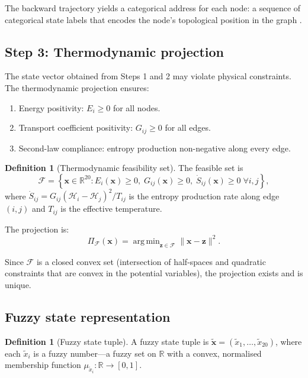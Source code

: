 \documentclass[twocolumn,10pt,a4paper]{article}
\theoremstyle{definition}
\newtheorem{definition}[theorem]{Definition}
\theoremstyle{remark}
\newcommand{\R}{\mathbb{R}}
\newcommand{\Hcal}{\mathcal{H}}
\newcommand{\Fcal}{\mathcal{F}}
\newcommand{\vect}[1]{\boldsymbol{#1}}
\newcommand{\fuzzy}[1]{\widetilde{#1}}
\DeclareMathOperator*{\argmin}{arg\,min}
\begin{document}
The backward trajectory yields a categorical address for each node: a sequence of categorical state labels that encodes the node's topological position in the graph \citep{Rabiner1989}.

\subsection{Step 3: Thermodynamic projection}

The state vector obtained from Steps 1 and 2 may violate physical constraints. The thermodynamic projection ensures:
\begin{enumerate}[label=(\alph*)]
    \item Energy positivity: $E_i \geq 0$ for all nodes.
    \item Transport coefficient positivity: $G_{ij} \geq 0$ for all edges.
    \item Second-law compliance: entropy production non-negative along every edge.
\end{enumerate}

\begin{definition}[Thermodynamic feasibility set]\label{def:feasible}
The feasible set is
\begin{equation}\label{eq:feasible}
    \Fcal = \left\{ \vect{x} \in \R^{20} : E_i(\vect{x}) \geq 0, \; G_{ij}(\vect{x}) \geq 0, \; \dot{S}_{ij}(\vect{x}) \geq 0 \; \forall i, j \right\},
\end{equation}
where $\dot{S}_{ij} = G_{ij}(\Hcal_i - \Hcal_j)^2 / T_{ij}$ is the entropy production rate along edge $(i,j)$ and $T_{ij}$ is the effective temperature.
\end{definition}

The projection is:
\begin{equation}\label{eq:projection}
    \Pi_{\Fcal}(\vect{x}) = \argmin_{\vect{z} \in \Fcal} \| \vect{x} - \vect{z} \|^2.
\end{equation}

Since $\Fcal$ is a closed convex set (intersection of half-spaces and quadratic constraints that are convex in the potential variables), the projection exists and is unique.

\subsection{Fuzzy state representation}

\begin{definition}[Fuzzy state tuple]\label{def:fuzzy_state}
A fuzzy state tuple is $\fuzzy{\vect{x}} = (\fuzzy{x}_1, \ldots, \fuzzy{x}_{20})$, where each $\fuzzy{x}_i$ is a fuzzy number---a fuzzy set on $\R$ with a convex, normalised membership function $\mu_{\fuzzy{x}_i} : \R \to [0,1]$.
\end{definition}
\end{document}
